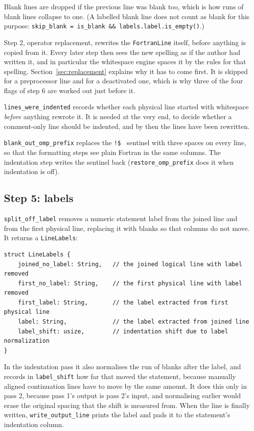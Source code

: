 \documentclass[11pt,a4paper,openany]{book}
\newcommand{\code}[1]{\texttt{\small #1}}
\begin{document}
Blank lines are dropped if the previous line was blank too, which is how runs of
blank lines collapse to one. (A labelled blank line does not count as blank
for this purpose: \code{skip\_blank = is\_blank \&\& labels.label.is\_empty()}.)

Step 2, operator replacement, rewrites the \code{FortranLine} itself, before
anything is copied from it. Every later step then sees the new spelling as if
the author had written it, and in particular the whitespace engine spaces it
by the rules for that spelling. Section~\ref{sec:replacement} explains why it
has to come first. It is skipped for a preprocessor line and for a deactivated
one, which is why three of the four flags of step 6 are worked out just before
it.

\code{lines\_were\_indented} records whether each physical line started with
whitespace \emph{before} anything rewrote it. It is needed at the very end, to
decide whether a comment-only line should be indented, and by then the lines
have been rewritten.

\code{blank\_out\_omp\_prefix} replaces the \code{!\$ } sentinel with three
spaces on every line, so that the formatting steps see plain Fortran in the
same columns. The indentation step writes the sentinel back
(\code{restore\_omp\_prefix} does it when indentation is off).

\subsection{Step 5: labels}

\code{split\_off\_label} removes a numeric statement label from the joined line and
from the first physical line, replacing it with blanks so that columns do not
move. It returns a \code{LineLabels}:

\begin{lstlisting}[style=rust]
struct LineLabels {
    joined_no_label: String,   // the joined logical line with label removed
    first_no_label: String,    // the first physical line with label removed
    first_label: String,       // the label extracted from first physical line
    label: String,             // the label extracted from joined line
    label_shift: usize,        // indentation shift due to label normalization
}
\end{lstlisting}

In the indentation pass it also normalises the run of blanks after the label,
and records in \code{label\_shift} how far that moved the statement, because
manually aligned continuation lines have to move by the same amount. It does
this only in pass 2, because pass 1's output is pass 2's input, and normalising
earlier would erase the original spacing that the shift is measured from. When
the line is finally written, \code{write\_output\_line} prints the label and
pads it to the statement's indentation column.
\end{document}
